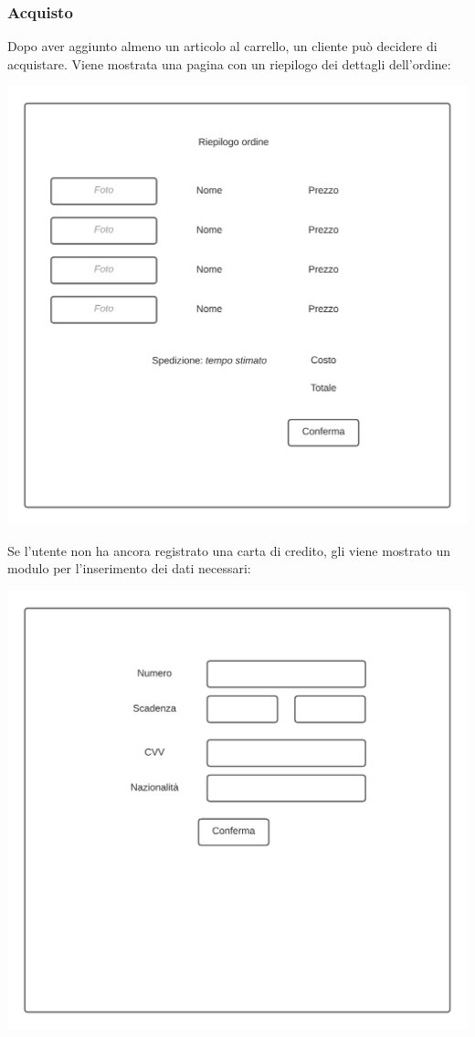 \documentclass[12pt]{article}
\begin{document}
\subsubsection{Acquisto}
Dopo aver aggiunto almeno un articolo al carrello, un cliente può decidere di acquistare. Viene mostrata una pagina con un riepilogo dei dettagli dell'ordine:

\begin{center}
\includegraphics[height=0.3\textheight]{Mockup/Cliente/ConfermaAcquisto}
\end{center}

\newpage
Se l'utente non ha ancora registrato una carta di credito, gli viene mostrato un modulo per l'inserimento dei dati necessari:
\begin{center}
\includegraphics[height=0.3\textheight]{Mockup/Cliente/DettagliCarta}
\end{center}
\end{document}

